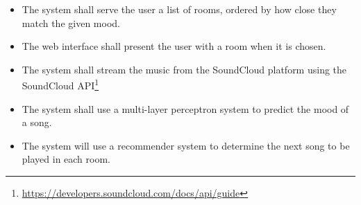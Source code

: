 \begin{itemize}
\item The system shall serve the user a list of rooms, ordered by how close they match the given mood.

\item The web interface shall present the user with a room when it is chosen.
	
\item The system shall stream the music from the SoundCloud platform using the SoundCloud API\footnote{\url{https://developers.soundcloud.com/docs/api/guide}}

\item The system shall use a multi-layer perceptron system to predict the mood of a song.

\item The system will use a recommender system to determine the next song to be played in each room.

\end{itemize}
